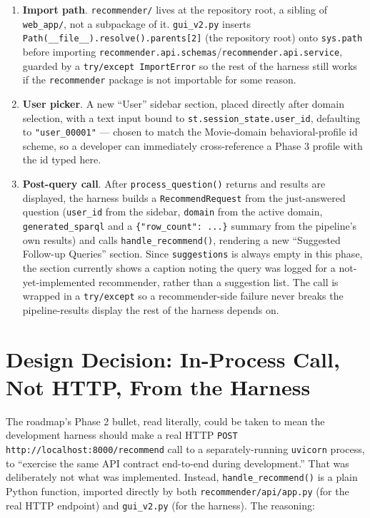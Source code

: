\documentclass[11pt,a4paper]{article}
\newcommand{\code}[1]{\texttt{#1}}
\begin{document}
\begin{enumerate}
    \item \textbf{Import path}. \code{recommender/} lives at the repository root, a sibling of
        \code{web\_app/}, not a subpackage of it. \code{gui\_v2.py} inserts
        \code{Path(\_\_file\_\_).resolve().parents[2]} (the repository root) onto \code{sys.path}
        before importing \code{recommender.api.schemas}/\code{recommender.api.service}, guarded by
        a \code{try/except ImportError} so the rest of the harness still works if the
        \code{recommender} package is not importable for some reason.
    \item \textbf{User picker}. A new ``User'' sidebar section, placed directly after domain
        selection, with a text input bound to \code{st.session\_state.user\_id}, defaulting to
        \code{"user\_00001"} --- chosen to match the Movie-domain behavioral-profile id scheme, so
        a developer can immediately cross-reference a Phase 3 profile with the id typed here.
    \item \textbf{Post-query call}. After \code{process\_question()} returns and results are
        displayed, the harness builds a \code{RecommendRequest} from the just-answered question
        (\code{user\_id} from the sidebar, \code{domain} from the active domain,
        \code{generated\_sparql} and a \code{\{"row\_count": ...\}} summary from the pipeline's
        own results) and calls \code{handle\_recommend()}, rendering a new ``Suggested Follow-up
        Queries'' section. Since \code{suggestions} is always empty in this phase, the section
        currently shows a caption noting the query was logged for a not-yet-implemented
        recommender, rather than a suggestion list. The call is wrapped in a \code{try/except} so
        a recommender-side failure never breaks the pipeline-results display the rest of the
        harness depends on.
\end{enumerate}

\newpage
\section{Design Decision: In-Process Call, Not HTTP, From the Harness}
\label{sec:design}

The roadmap's Phase 2 bullet, read literally, could be taken to mean the development harness
should make a real HTTP \code{POST http://localhost:8000/recommend} call to a separately-running
\code{uvicorn} process, to ``exercise the same API contract end-to-end during development.'' That
was deliberately not what was implemented. Instead, \code{handle\_recommend()} is a plain Python
function, imported directly by both \code{recommender/api/app.py} (for the real HTTP endpoint) and
\code{gui\_v2.py} (for the harness). The reasoning:
\end{document}
